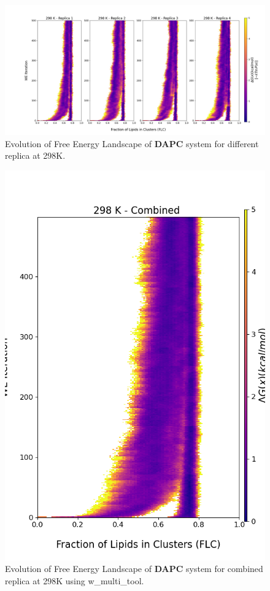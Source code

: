 \documentclass{biophys-new}
\begin{document}
\begin{figure}[hbt!]
\centering
\includegraphics[width=1.1\linewidth]{all_plots/ClusterLipids2Total/DPPC_DAPC_CHOL/298K/Evolution_DAPC_298_ClusterLipids2Total.png}
\caption{Evolution of Free Energy Landscape of \textbf{DAPC} system for different replica at 298K.}
\label{fig:view}

\end{figure}

\begin{figure}[hbt!]
\centering
\includegraphics[width=0.8\linewidth]{all_plots/ClusterLipids2Total/DPPC_DAPC_CHOL/298K/Evolution_DAPC_MULTI__298_ClusterLipids2Total.png}
\caption{Evolution of Free Energy Landscape of \textbf{DAPC} system for combined replica at 298K using w\_multi\_tool.}
\label{fig:view}

\end{figure}
\end{document}
